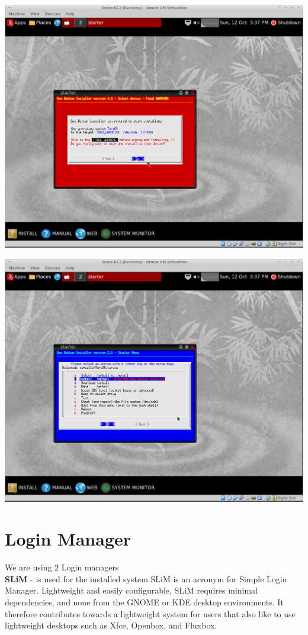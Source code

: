 \documentclass[12pt,a4paper]{book}
\begin{document}
\includegraphics[width=0.7\linewidth]{screen-shots/torios-rc2-install8-final-warning}

\includegraphics[width=0.7\linewidth]{screen-shots/torios-rc2-install9}





 
\newpage

\chapter{Login Manager}
We are using 2 Login managers\\
	
\textbf{SLiM} \cite{SliM}- is used for the installed system
SLiM is an acronym for Simple Login Manager. Lightweight and easily configurable, SLiM requires minimal dependencies, and none from the GNOME or KDE desktop environments. It therefore contributes towards a lightweight system for users that also like to use lightweight desktops such as Xfce, Openbox, and Fluxbox. \\
\end{document}

